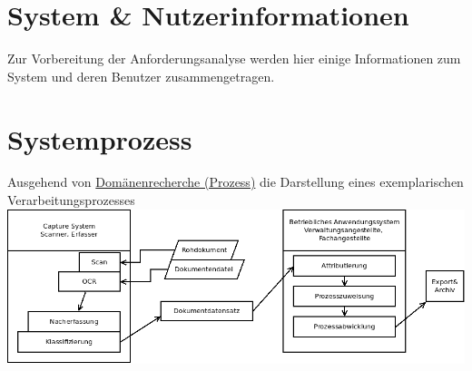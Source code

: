 \documentclass[11pt,oneside,a4paper,notitlepage]{article}
\begin{document}
%
\section{System \& Nutzerinformationen}

Zur Vorbereitung der Anforderungsanalyse werden hier einige Informationen zum System und deren Benutzer zusammengetragen.


\section{Systemprozess}
%
Ausgehend von \href{EISWS1516Howe_Domaenenrecherche.pdf}{Domänenrecherche (Prozess)} die Darstellung eines exemplarischen Verarbeitungsprozesses\\

\includegraphics[width=\textwidth]{EISWS1516Howe_Prozess_deskriptiv.png}
\noindent




%
\end{document}
